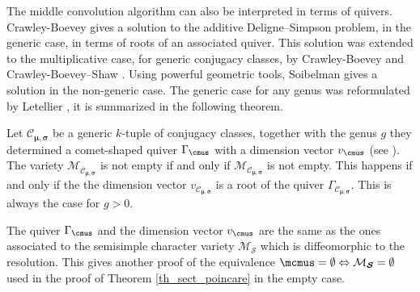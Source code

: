 The middle convolution algorithm can also be interpreted in terms of quivers. Crawley-Boevey \cite{Crawley-Boevey2003} gives a solution to the additive Deligne--Simpson problem, in the generic case, in terms of roots of an associated quiver. This solution was extended to the multiplicative case, for generic conjugacy classes, by Crawley-Boevey \cite[Th.\,8.3]{Crawley-Boevey_parabolic} and Crawley-Boevey--Shaw \cite{Crawley-Boevey_Shaw}. Using powerful geometric tools, Soibelman \cite{Soibelman16,Soibelman18} gives a solution in the non-generic case.
The generic case for any genus was reformulated by Letellier \cite[Th.\,4.1.7]{Letellier_gl} \cite[Cor.\,3.15]{Letellier13}, it is summarized in the following theorem.
\begin{theorem}
Let $\mathcal{C}_{\boldsymbol{\mu},\boldsymbol{\sigma}}$ be a generic $k$-tuple of conjugacy classes, together with the genus $g$ they determined a comet-shaped quiver $\Gamma_{\cmus}$ with a dimension vector $v_{\cmus}$ (see \cite[\S 3.2]{Letellier13}). The variety $\mathcal{M}_{\overline{\mathcal{C}}_{\boldsymbol{\mu},\boldsymbol{\sigma}}}$ is not empty if and only if $\mathcal{M}_{\mathcal{C}_{\boldsymbol{\mu},\boldsymbol{\sigma}}}$ is not empty. This happens if and only if the the dimension vector $v_{\mathcal{C}_{\boldsymbol{\mu},\boldsymbol{\sigma}}}$ is a root of the quiver $\Gamma_{\mathcal{C}_{\boldsymbol{\mu},\boldsymbol{\sigma}}}$. This is always the case for $g>0$.
\end{theorem}
\begin{remark}
The quiver $\Gamma_{\cmus}$ and the dimension vector $v_{\cmus}$ are the same as the ones associated to the semisimple character variety $\mathcal{M}_{\boldsymbol{\mathcal{S}}}$ which is diffeomorphic to the resolution. This gives another proof of the equivalence $\mcmus = \emptyset \Leftrightarrow \mathcal{M}_{\boldsymbol{\mathcal{S}}} = \emptyset$ used in the proof of Theorem \ref{th_sect_poincare} in the empty case.
\end{remark}

\label{subsect_twisted_poincare}

